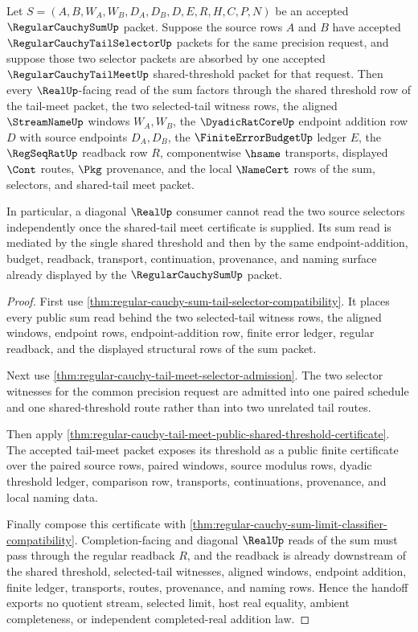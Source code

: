 \begin{theorem}
\label{thm:regular-cauchy-sum-shared-tail-meet-handoff}
Let $S=(A,B,W_A,W_B,D_A,D_B,D,E,R,H,C,P,N)$ be an accepted $\RegularCauchySumUp$ packet. Suppose the source rows $A$ and $B$ have accepted $\RegularCauchyTailSelectorUp$ packets for the same precision request, and suppose those two selector packets are absorbed by one accepted $\RegularCauchyTailMeetUp$ shared-threshold packet for that request. Then every $\RealUp$-facing read of the sum factors through the shared threshold row of the tail-meet packet, the two selected-tail witness rows, the aligned $\StreamNameUp$ windows $W_A,W_B$, the $\DyadicRatCoreUp$ endpoint addition row $D$ with source endpoints $D_A,D_B$, the $\FiniteErrorBudgetUp$ ledger $E$, the $\RegSeqRatUp$ readback row $R$, componentwise $\hsame$ transports, displayed $\Cont$ routes, $\Pkg$ provenance, and the local $\NameCert$ rows of the sum, selectors, and shared-tail meet packet.

In particular, a diagonal $\RealUp$ consumer cannot read the two source selectors independently once the shared-tail meet certificate is supplied. Its sum read is mediated by the single shared threshold and then by the same endpoint-addition, budget, readback, transport, continuation, provenance, and naming surface already displayed by the $\RegularCauchySumUp$ packet.
\end{theorem}
\begin{proof}
First use \autoref{thm:regular-cauchy-sum-tail-selector-compatibility}. It places every public sum read behind the two selected-tail witness rows, the aligned windows, endpoint rows, endpoint-addition row, finite error ledger, regular readback, and the displayed structural rows of the sum packet.

Next use \autoref{thm:regular-cauchy-tail-meet-selector-admission}. The two selector witnesses for the common precision request are admitted into one paired schedule and one shared-threshold route rather than into two unrelated tail routes.

Then apply \autoref{thm:regular-cauchy-tail-meet-public-shared-threshold-certificate}. The accepted tail-meet packet exposes its threshold as a public finite certificate over the paired source rows, paired windows, source modulus rows, dyadic threshold ledger, comparison row, transports, continuations, provenance, and local naming data.

Finally compose this certificate with \autoref{thm:regular-cauchy-sum-limit-classifier-compatibility}. Completion-facing and diagonal $\RealUp$ reads of the sum must pass through the regular readback $R$, and the readback is already downstream of the shared threshold, selected-tail witnesses, aligned windows, endpoint addition, finite ledger, transports, routes, provenance, and naming rows. Hence the handoff exports no quotient stream, selected limit, host real equality, ambient completeness, or independent completed-real addition law.
\end{proof}

